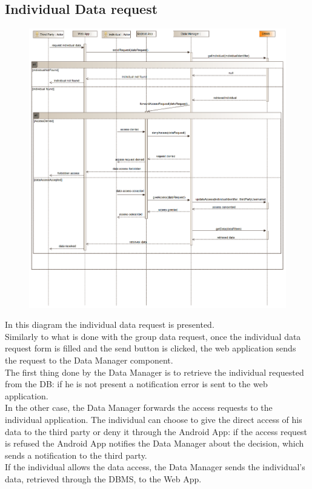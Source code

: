 \subsection{Individual Data request}
\begin{figure}[H]
\centering
\includegraphics[width=\linewidth]{resources/uml/sequence/RequestIndividualData.png}
\end{figure}
In this diagram the individual data request is presented.\\
Similarly to what is done with the group data request, once the individual data request form is filled and the send button is clicked, the web application sends the request to the Data Manager component.\\
The first thing done by the Data Manager is to retrieve the individual requested from the DB: if he is not present a notification error is sent to the web application.\\
In the other case, the Data Manager forwards the access requests to the individual application.
The individual can choose to give the direct access of his data to the third party or deny it through the Android App: if the access request is refused the Android App notifies the Data Manager about the decision, which sends a notification to the third party.\\
If the individual allows the data access, the Data Manager sends the individual's data, retrieved through the DBMS, to the Web App.


